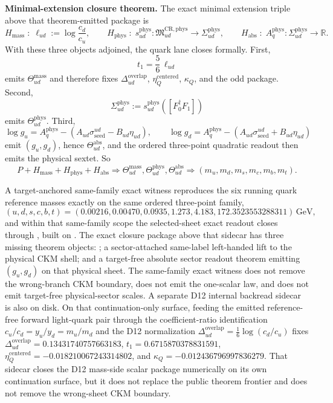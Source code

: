 \textbf{Minimal-extension closure theorem.} The exact minimal extension triple above that theorem-emitted package is
\[
H_{\mathrm{mass}}
\;:\;
\ell_{ud}:=\log\frac{c_d}{c_u},
\qquad
H_{\mathrm{phys}}
\;:\;
s_{ud}^{\mathrm{phys}}:\mathfrak M_{ud}^{\mathrm{CR,phys}}\to\Sigma_{ud}^{\mathrm{phys}},
\qquad
H_{\mathrm{abs}}
\;:\;
A_q^{\mathrm{phys}}:\Sigma_{ud}^{\mathrm{phys}}\to\mathbb R.
\]
With these three objects adjoined, the quark lane closes formally. First,
\[
t_1=\frac56\,\ell_{ud}
\]
emits \(\Theta_{ud}^{\mathrm{mass}}\) and therefore fixes \(\Delta_{ud}^{\mathrm{overlap}}\), \(\eta_Q^{\mathrm{centered}}\), \(\kappa_Q\), and the odd package. Second,
\[
\Sigma_{ud}^{\mathrm{phys}}
:=
s_{ud}^{\mathrm{phys}}([F_0^\dagger F_1])
\]
emits \(\Theta_{ud}^{\mathrm{phys}}\). Third,
\[
\log g_u
=
A_q^{\mathrm{phys}}-(A_{ud}\sigma_{\mathrm{seed}}^{ud}-B_{ud}\eta_{ud}),
\qquad
\log g_d
=
A_q^{\mathrm{phys}}-(A_{ud}\sigma_{\mathrm{seed}}^{ud}+B_{ud}\eta_{ud})
\]
emit \((g_u,g_d)\), hence \(\Theta_{ud}^{\mathrm{abs}}\), and the ordered three-point quadratic readout then emits the physical sextet. So
\[
P+H_{\mathrm{mass}}+H_{\mathrm{phys}}+H_{\mathrm{abs}}
\Longrightarrow
\Theta_{ud}^{\mathrm{mass}},\Theta_{ud}^{\mathrm{phys}},\Theta_{ud}^{\mathrm{abs}}
\Longrightarrow
(m_u,m_d,m_s,m_c,m_b,m_t).
\]

A target-anchored same-family exact witness reproduces the six running quark reference masses exactly on the same ordered three-point family,
\[
(u,d,s,c,b,t)=(0.00216,0.00470,0.0935,1.273,4.183,172.3523553288311)\,\mathrm{GeV},
\]
and within that same-family scope the selected-sheet exact readout closes through , built on . The exact closure package above that sidecar has three missing theorem objects: ; a sector-attached same-label left-handed lift to the physical CKM shell; and a target-free absolute sector readout theorem emitting \((g_u,g_d)\) on that physical sheet. The same-family exact witness does not remove the wrong-branch CKM boundary, does not emit the one-scalar law, and does not emit target-free physical-sector scales.
A separate D12 internal backread sidecar is also on disk. On that continuation-only surface, feeding the emitted reference-free forward light-quark pair through the coefficient-ratio identification \(c_u/c_d=y_u/y_d=m_u/m_d\) and the D12 normalization \(\Delta_{ud}^{\mathrm{overlap}}=\tfrac16\log(c_d/c_u)\) fixes \(\Delta_{ud}^{\mathrm{overlap}}=0.13431740757663183\), \(t_1=0.6715870378831591\), \(\eta_Q^{\mathrm{centered}}=-0.018210067243314802\), and \(\kappa_Q=-0.012436796997836279\). That sidecar closes the D12 mass-side scalar package numerically on its own continuation surface, but it does not replace the public theorem frontier and does not remove the wrong-sheet CKM boundary.

